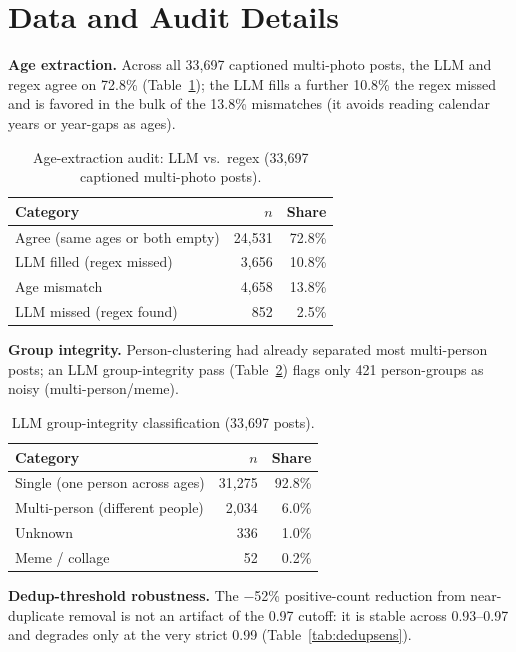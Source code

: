 \documentclass[letterpaper]{article} %
\begin{document}
\section{Data and Audit Details}\label{sup:audit}
\textbf{Age extraction.} Across all 33{,}697 captioned multi-photo posts, the LLM and regex agree on 72.8\% (Table~\ref{tab:age}); the LLM fills a further 10.8\% the regex missed and is favored in the bulk of the 13.8\% mismatches (it avoids reading calendar years or year-gaps as ages).

\begin{table}[t]
\centering
\small
\begin{tabular}{@{}lrr@{}}
\toprule
Category & $n$ & Share \\
\midrule
Agree (same ages or both empty) & 24{,}531 & 72.8\% \\
LLM filled (regex missed) & 3{,}656 & 10.8\% \\
Age mismatch & 4{,}658 & 13.8\% \\
LLM missed (regex found) & 852 & 2.5\% \\
\bottomrule
\end{tabular}
\caption{Age-extraction audit: LLM vs.\ regex (33{,}697 captioned multi-photo posts).}
\label{tab:age}
\end{table}

\textbf{Group integrity.} Person-clustering had already separated most multi-person posts; an LLM group-integrity pass (Table~\ref{tab:integrity}) flags only 421 person-groups as noisy (multi-person/meme).

\begin{table}[t]
\centering
\small
\begin{tabular}{@{}lrr@{}}
\toprule
Category & $n$ & Share \\
\midrule
Single (one person across ages) & 31{,}275 & 92.8\% \\
Multi-person (different people) & 2{,}034 & 6.0\% \\
Unknown & 336 & 1.0\% \\
Meme / collage & 52 & 0.2\% \\
\bottomrule
\end{tabular}
\caption{LLM group-integrity classification (33{,}697 posts).}
\label{tab:integrity}
\end{table}

\textbf{Dedup-threshold robustness.} The $-$52\% positive-count reduction from near-duplicate removal is not an artifact of the 0.97 cutoff: it is stable across 0.93--0.97 and degrades only at the very strict 0.99 (Table~\ref{tab:dedupsens}).
\end{document}
